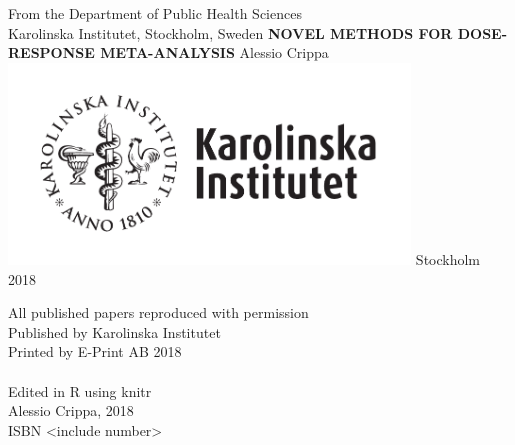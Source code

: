 \documentclass[11pt,a4paper,twoside,openany]{book}\usepackage{knitr}
\begin{document}
\frontmatter
\pagestyle{nothing}

%

\begin{titlepage}
\begin{center}
\large
From the Department of Public Health Sciences \\
Karolinska Institutet, Stockholm, Sweden        
\vfill
\Large
\textbf{\textsf{NOVEL METHODS FOR DOSE-RESPONSE META-ANALYSIS}}
\vfill
\Large
Alessio Crippa
\vfill
\includegraphics[width=0.8\textwidth]{figures/ki-logo_pos}
\vfill
\large
Stockholm 2018        
\end{center}
\restoregeometry
\end{titlepage}

\newpage
\null
\vfill
\noindent All published papers reproduced with permission \\
Published by Karolinska Institutet \\
Printed by E-Print AB 2018 \\
\\
Edited in R using knitr \\
\textcopyright Alessio Crippa, 2018 \\
ISBN <include number>
\newpage
\end{document}
